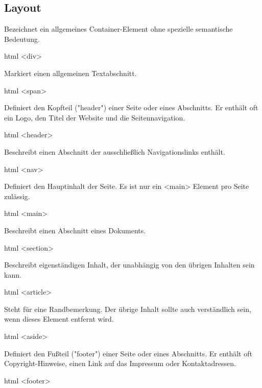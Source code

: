 \documentclass[10pt,a4paper]{article}
\begin{document}
\begin{multicols}{3}
\subsection*{Layout}

Bezeichnet ein allgemeines Container-Element ohne spezielle semantische Bedeutung.
\begin{codebox}{html}{}
<div>
\end{codebox}

Markiert einen allgemeinen Textabschnitt.
\begin{codebox}{html}{}
<span>
\end{codebox}

Definiert den Kopfteil ("header") einer Seite oder eines Abschnitts. Er enthält oft ein Logo, den Titel der Website und die Seitennavigation.
\begin{codebox}{html}{}
<header>
\end{codebox}

Beschreibt einen Abschnitt der ausschließlich Navigationslinks enthält.
\begin{codebox}{html}{}
<nav>
\end{codebox}

Definiert den Hauptinhalt der Seite. Es ist nur ein <main> Element pro Seite zulässig.
\begin{codebox}{html}{}
<main>
\end{codebox}

Beschreibt einen Abschnitt eines Dokuments.
\begin{codebox}{html}{}
<section>
\end{codebox}

Beschreibt eigenständigen Inhalt, der unabhängig von den übrigen Inhalten sein kann.
\begin{codebox}{html}{}
<article>
\end{codebox}

Steht für eine Randbemerkung. Der übrige Inhalt sollte auch verständlich sein, wenn dieses Element entfernt wird.
\begin{codebox}{html}{}
<aside>
\end{codebox}

Definiert den Fußteil ("footer") einer Seite oder eines Abschnitts. Er enthält oft Copyright-Hinweise, einen Link auf das Impressum oder Kontaktadressen.
\begin{codebox}{html}{}
<footer>
\end{codebox}




\printbibliography
{}
\end{multicols}
\end{document}
